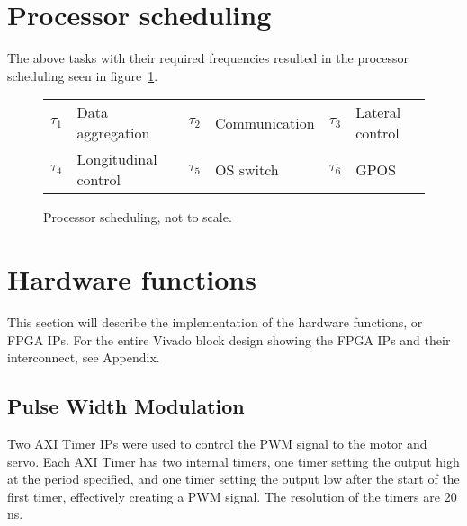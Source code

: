 \section{Processor scheduling}
The above tasks with their required frequencies resulted in the processor scheduling seen in figure~\ref{fig:rtsched}.

\begin{figure}[H]
\centering
\begin{RTGrid}[nonumbers=1]{6}{25}








\end{RTGrid}
\caption{Processor scheduling, not to scale.}\label{fig:rtsched}
\begin{tabular}{r@{: }l r@{: }l r@{: }l}
$\tau_1$ & Data aggregation & $\tau_2$ & Communication & $\tau_3$ & Lateral control\\
$\tau_4$ & Longitudinal control & $\tau_5$ & OS switch & $\tau_6$ & GPOS
\end{tabular}
\end{figure}

\section{Hardware functions}
This section will describe the implementation of the hardware functions, or FPGA IPs. For the entire Vivado block design showing the FPGA IPs and their interconnect, see Appendix.

\subsection{Pulse Width Modulation}
Two AXI Timer IPs were used to control the PWM signal to the motor and servo. Each AXI Timer has two internal timers, one timer setting the output high at the period specified, and one timer setting the output low after the start of the first timer, effectively creating a PWM signal. The resolution of the timers are 20 ns.

